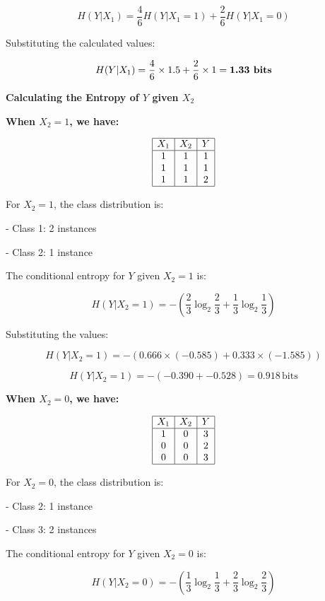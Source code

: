 \documentclass[12pt]{article}
\begin{document}
\[
  H(Y|X_1) = \frac{4}{6} H(Y|X_1 = 1) + \frac{2}{6} H(Y|X_1 = 0)
\]

Substituting the calculated values:

\[
  H(Y|X_1) = \frac{4}{6} \times 1.5 + \frac{2}{6} \times 1 = \textbf{1.33 \text{bits}}
\]

\textbf{Calculating the Entropy of $Y$ given $X_2$}

\textbf{When $X_2 = 1$, we have:}

\[
  \begin{array}{|c|c|c|}
    \hline
    X_1 & X_2 & Y \\
    \hline
    1   & 1   & 1 \\
    1   & 1   & 1 \\
    1   & 1   & 2 \\
    \hline
  \end{array}
\]

For \( X_2 = 1 \), the class distribution is:

- Class 1: 2 instances

- Class 2: 1 instance

The conditional entropy for \( Y \) given \( X_2 = 1 \) is:

\[
  H(Y|X_2 = 1) = -\left( \frac{2}{3} \log_2 \frac{2}{3} + \frac{1}{3} \log_2 \frac{1}{3} \right)
\]

Substituting the values:

\[
  H(Y|X_2 = 1) = -\left( 0.666 \times (-0.585) + 0.333 \times (-1.585) \right)
\]

\[
  H(Y|X_2 = 1) = -( -0.390 + -0.528 ) = 0.918 \, \text{bits}
\]

\textbf{When $X_2 = 0$, we have:}

\[
  \begin{array}{|c|c|c|}
    \hline
    X_1 & X_2 & Y \\
    \hline
    1   & 0   & 3 \\
    0   & 0   & 2 \\
    0   & 0   & 3 \\
    \hline
  \end{array}
\]

For \( X_2 = 0 \), the class distribution is:

- Class 2: 1 instance

- Class 3: 2 instances

The conditional entropy for \( Y \) given \( X_2 = 0 \) is:

\[
  H(Y|X_2 = 0) = -\left( \frac{1}{3} \log_2 \frac{1}{3} + \frac{2}{3} \log_2 \frac{2}{3} \right)
\]
\end{document}

